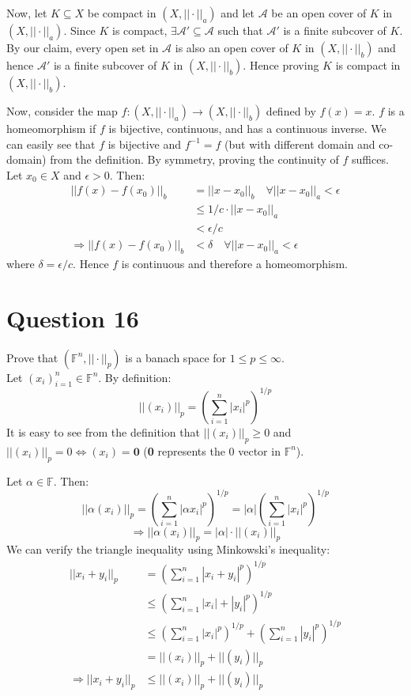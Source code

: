 \documentclass{article}
\begin{document}
	Now, let $K \subseteq X$ be compact in $(X, ||\cdot||_a)$ and let $\mathcal{A}$ be an open
	cover of $K$ in $(X, ||\cdot||_a)$.
	Since $K$ is compact, $\exists \mathcal{A}' \subseteq \mathcal{A}$ such that $\mathcal{A}'$
	is a finite subcover of $K$.
	By our claim, every open set in $\mathcal{A}$ is also an open cover of $K$ in $(X, ||\cdot||_b)$
	and hence $\mathcal{A}'$ is a finite subcover of $K$ in $(X, ||\cdot||_b)$.
	Hence proving $K$ is compact in $(X, ||\cdot||_b)$.

	Now, consider the map $f: (X, ||\cdot||_a) \to (X, ||\cdot||_b)$ defined by $f(x) = x$.
	$f$ is a homeomorphism if $f$ is bijective, continuous, and has a continuous inverse.
	We can easily see that $f$ is bijective and $f^{-1} = f$ (but with different domain and
	co-domain) from the definition.
	By symmetry, proving the continuity of $f$ suffices.
	Let $x_0 \in X$ and $\epsilon > 0$.
	Then:
	\begin{align*}
		||f(x) - f(x_0)||_b &= ||x - x_0||_b \quad \forall ||x - x_0||_a < \epsilon \\
		&\le 1/c \cdot ||x - x_0||_a \\
		&< \epsilon / c \\
		\Rightarrow ||f(x) - f(x_0)||_b &< \delta \quad \forall ||x - x_0||_a < \epsilon
	\end{align*}
	where $\delta = \epsilon / c$.
	Hence $f$ is continuous and therefore a homeomorphism.

\section{Question 16}

	Prove that $(\mathbb{F}^n, ||\cdot||_p)$ is a banach space for $ 1\le p \le \infty$. \\

	Let $(x_i)_{i = 1}^n \in \mathbb{F}^n$.
	By definition:
	\[ ||(x_i)||_p = \left(\sum_{i = 1}^n |x_i|^p\right) ^ {1/p} \]
	It is easy to see from the definition that $||(x_i)||_p \ge 0$ and
	$||(x_i)||_p = 0 \Leftrightarrow (x_i) = \mathbf{0}$ (\textbf{0} represents the 0 vector
	in $\mathbb{F}^n$).

	Let $\alpha \in \mathbb{F}$.
	Then:
	\[
		||\alpha (x_i)||_p = \left(\sum_{i = 1}^n |\alpha x_i|^p\right) ^ {1/p}
		= |\alpha| \left(\sum_{i = 1}^n |x_i|^p\right) ^ {1/p}
	\]
	\[
		\Rightarrow ||\alpha (x_i)||_p = |\alpha| \cdot ||(x_i)||_p
	\]
	We can verify the triangle inequality using Minkowski's inequality:
	\begin{align*}
		||x_i + y_i||_p &= \left(\sum_{i = 1}^n |x_i + y_i|^p\right) ^ {1/p} \\
		&\le \left(\sum_{i = 1}^n |x_i| + |y_i|^p\right) ^ {1/p} \\
		&\le \left(\sum_{i = 1}^n |x_i|^p\right) ^ {1/p} + \left(\sum_{i = 1}^n |y_i|^p\right) ^ {1/p} \\
		&= ||(x_i)||_p + ||(y_i)||_p \\
		\Rightarrow ||x_i + y_i||_p &\le ||(x_i)||_p + ||(y_i)||_p
	\end{align*}
\end{document}
